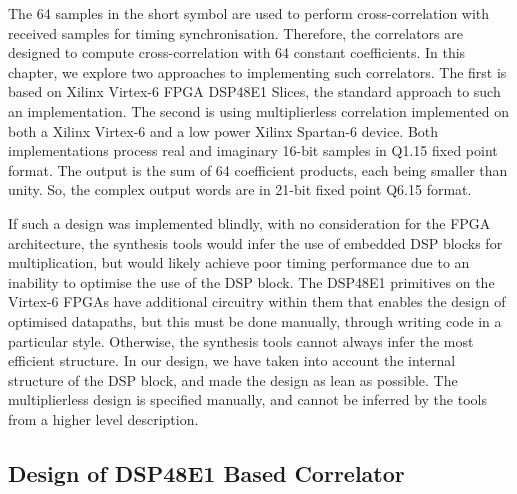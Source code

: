 The 64 samples in the short symbol are used to perform cross-correlation with received samples for timing synchronisation.
Therefore, the correlators are designed to compute cross-correlation with 64 constant coefficients.
In this chapter, we explore two approaches to implementing such correlators.
The first is based on Xilinx Virtex-6 FPGA DSP48E1 Slices, the standard approach to such an implementation.
The second is using multiplierless correlation implemented on both a Xilinx Virtex-6 and a low power Xilinx Spartan-6 device.
Both implementations process real and imaginary 16-bit samples in Q1.15 fixed point format.
The output is the sum of 64 coefficient products, each being smaller than unity.
So, the complex output words are in 21-bit fixed point Q6.15 format.

If such a design was implemented blindly, with no consideration for the FPGA architecture, the synthesis tools would infer the use of embedded DSP blocks for multiplication, but would likely achieve poor timing performance due to an inability to optimise the use of the DSP block.
The DSP48E1 primitives on the Virtex-6 FPGAs have additional circuitry within them that enables the design of optimised datapaths, but this must be done manually, through writing code in a particular style.
Otherwise, the synthesis tools cannot always infer the most efficient structure.
In our design, we have taken into account the internal structure of the DSP block, and made the design as lean as possible.
The multiplierless design is specified manually, and cannot be inferred by the tools from a higher level description.

\subsection{Design of DSP48E1 Based Correlator}

